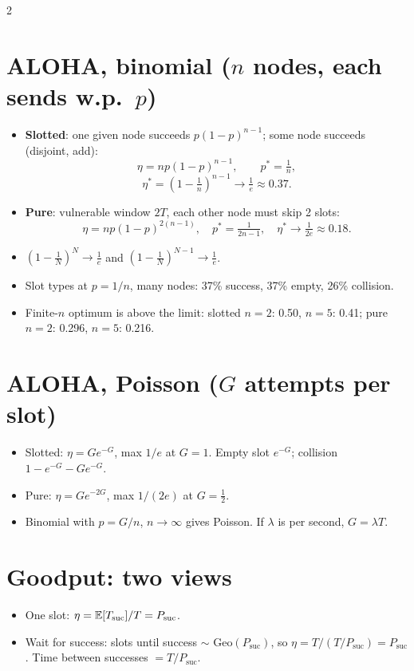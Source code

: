 \begin{multicols}{2}
\section{ALOHA, binomial ($n$ nodes, each sends w.p.\ $p$)}
\begin{itemize}
  \item \textbf{Slotted}: one given node succeeds $p(1-p)^{n-1}$; some node succeeds (disjoint, add):
  \[ \eta=np(1-p)^{n-1},\qquad p^*=\tfrac1n, \]
  \[ \eta^*=(1-\tfrac1n)^{n-1}\to\tfrac1e\approx0.37. \]
  \item \textbf{Pure}: vulnerable window $2T$, each other node must skip 2 slots:
  \[ \eta=np(1-p)^{2(n-1)},\quad p^*=\tfrac1{2n-1},\quad \eta^*\to\tfrac1{2e}\approx0.18. \]
  \item $(1-\frac1N)^N\to\frac1e$ and $(1-\frac1N)^{N-1}\to\frac1e$.
  \item Slot types at $p=1/n$, many nodes: 37\% success, 37\% empty, 26\% collision.
  \item Finite-$n$ optimum is above the limit: slotted $n{=}2$: 0.50, $n{=}5$: 0.41; pure $n{=}2$: 0.296, $n{=}5$: 0.216.
\end{itemize}

\section{ALOHA, Poisson ($G$ attempts per slot)}
\begin{itemize}
  \item Slotted: $\eta=Ge^{-G}$, max $1/e$ at $G=1$. Empty slot $e^{-G}$; collision $1-e^{-G}-Ge^{-G}$.
  \item Pure: $\eta=Ge^{-2G}$, max $1/(2e)$ at $G=\frac12$.
  \item Binomial with $p=G/n$, $n\to\infty$ gives Poisson. If $\lambda$ is per second, $G=\lambda T$.
\end{itemize}

\section{Goodput: two views}
\begin{itemize}
  \item One slot: $\eta=\mathbb{E}[T_{\text{suc}}]/T=P_{\text{suc}}$.
  \item Wait for success: slots until success $\sim$ Geo$(P_{\text{suc}})$, so $\eta=T/(T/P_{\text{suc}})=P_{\text{suc}}$. Time between successes $=T/P_{\text{suc}}$.
\end{itemize}


\end{multicols}
